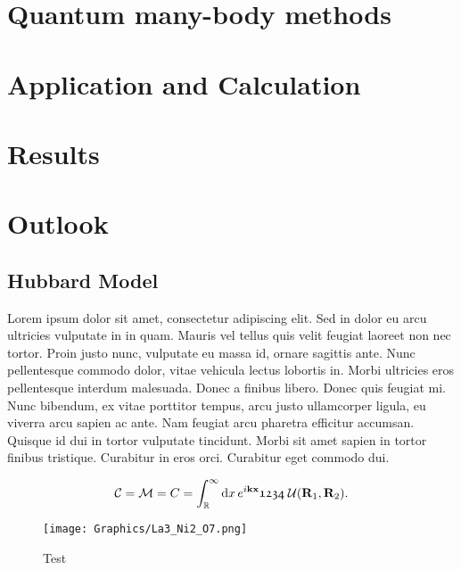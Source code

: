 \documentclass[12pt]{book}
\begin{document}
\cleardoublepage





\tableofcontents
\cleardoublepage

\setcounter{page}{0}



%


\chapter{Quantum many-body methods}

\chapter{Application and Calculation}

\chapter{Results}

\chapter{Outlook}

\section{Hubbard Model}

Lorem ipsum dolor sit amet, consectetur adipiscing elit. Sed in dolor eu arcu ultricies vulputate in in quam. Mauris vel tellus quis velit feugiat laoreet non nec tortor. Proin justo nunc, vulputate eu massa id, ornare sagittis ante. Nunc pellentesque commodo dolor, vitae vehicula lectus lobortis in. Morbi ultricies eros pellentesque interdum malesuada. Donec a finibus libero. Donec quis feugiat mi. Nunc bibendum, ex vitae porttitor tempus, arcu justo ullamcorper ligula, eu viverra arcu sapien ac ante. Nam feugiat arcu pharetra efficitur accumsan. Quisque id dui in tortor vulputate tincidunt. Morbi sit amet sapien in tortor finibus tristique. Curabitur in eros orci. Curabitur eget commodo dui.

\begin{align}
	\mathcal{C}=\mathcal{M}=C=\int_{\mathbb{R}}^{\infty}\text{d}x\, e^{i\textbf{kx}}\mathfrak{1234}\;\mathcal{U}(\textbf{R}_1, \textbf{R}_2).
\end{align}

\begin{figure}[ht!]
	\centering
	\texttt{[image: Graphics/La3\_Ni2\_O7.png]}
	\caption{Test}
	\label{fig:test}
\end{figure}
\end{document}
